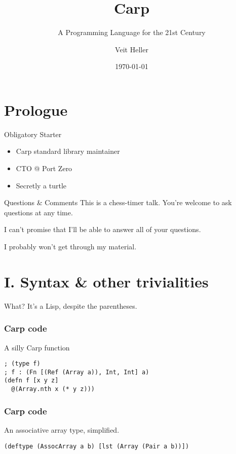 \documentclass[aspectratio=169]{beamer}
\title{Carp}
\subtitle{A Programming Language for the 21st Century}
\date{\today}
\author{Veit Heller}
\institute{Port Zero}
\begin{document}
  \maketitle
  \section{Prologue}
  \begin{frame}{Obligatory Starter}
    \begin{itemize}
      \item Carp standard library maintainer
      \item CTO @ Port Zero
      \item Secretly a turtle
    \end{itemize}
  \end{frame}
  \begin{frame}{Questions \& Comments}
    This is a chess-timer talk. You’re welcome to ask questions at any time.
    \linebreak

    I can’t promise that I’ll be able to answer all of your questions.
    \linebreak

    I probably won’t get through my material.
  \end{frame}
  \section{I. Syntax \& other trivialities}
  \begin{frame}{What?}
    It’s a Lisp, despite the parentheses.
  \end{frame}
  \begin{frame}[fragile]
  \frametitle{Carp code}
    \begin{listing}[H]
      \caption{A silly Carp function}
      \begin{verbatim}
; (type f)
; f : (Fn [(Ref (Array a)), Int, Int] a)
(defn f [x y z]
  @(Array.nth x (* y z)))
      \end{verbatim}
    \end{listing}
  \end{frame}
  \begin{frame}[fragile]
    \frametitle{Carp code}
    \begin{listing}[H]
      \caption{An associative array type, simplified.}
      \begin{verbatim}
(deftype (AssocArray a b) [lst (Array (Pair a b))])
      \end{verbatim}
    \end{listing}
  \end{frame}
\end{document}
